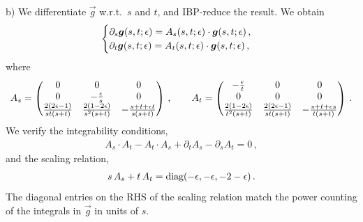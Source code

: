 \smallskip
\noindent
b) We differentiate $\vec{g}$ w.r.t.\ $s$ and $t$, and IBP-reduce the result. We obtain
\begin{align}
\begin{cases}
\partial_s \vec{g}(s,t;\eps)  = A_s(s,t;\eps)  \cdot   \vec{g}(s,t;\eps) \,, \\
\partial_t \vec{g}(s,t;\eps)  = A_t(s,t;\eps)  \cdot   \vec{g}(s,t;\eps) \,, \\
\end{cases}
\end{align}
where
\begin{align}
A_s = \begin{pmatrix}
0 & 0 & 0 \\
0 & -\frac{\epsilon}{s} & 0 \\ 
\frac{2 (2 \epsilon-1)}{s t (s + t)} &
\frac{2 (1 - 2 \epsilon)}{s^2 (s + t)} & 
  - \frac{s + t + \epsilon t}{s (s + t)} \\
\end{pmatrix} \,, \qquad
A_t = \begin{pmatrix}
-\frac{\epsilon}{t} & 0 & 0 \\
0 & 0 & 0 \\ 
\frac{2 (1 - 2 \epsilon)}{t^2 (s + t)} & 
 \frac{2 (2 \epsilon -1 )}{s t (s + t)} & 
 - \frac{s + t + \epsilon s}{t (s + t)} \\
\end{pmatrix} \,.
\end{align}
We verify the integrability conditions,
\begin{align}
A_s \cdot A_t - A_t \cdot A_s+ \partial_t A_s - \partial_s A_t = 0 \,,
\end{align}
and the scaling relation,
\begin{align}
s \, A_s + t \, A_t = \text{diag}( - \epsilon, - \epsilon , -2 -\epsilon ) \,.
\end{align}
The diagonal entries on the RHS of the scaling relation match the power counting of the integrals in $\vec{g}$ in units of $s$.

